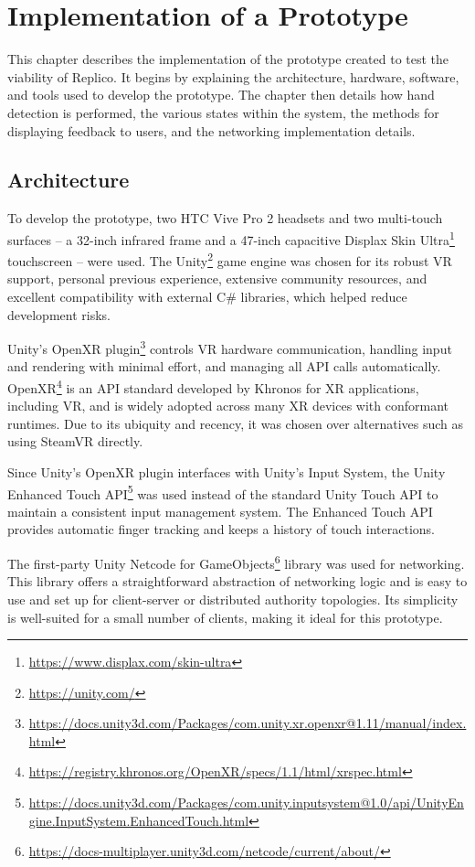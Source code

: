 \chapter{Implementation of a Prototype}\label{chap:prototype}

This chapter describes the implementation of the prototype created to test the viability of Replico. It begins by explaining the architecture, hardware, software, and tools used to develop the prototype. The chapter then details how hand detection is performed, the various states within the system, the methods for displaying feedback to users, and the networking implementation details.

\section{Architecture}
    
    To develop the prototype, two HTC Vive Pro 2 headsets and two multi-touch surfaces -- a 32-inch infrared frame and a 47-inch capacitive Displax Skin Ultra\footnote{\url{https://www.displax.com/skin-ultra} } touchscreen -- were used. The Unity\footnote{\url{https://unity.com/}} game engine was chosen for its robust VR support, personal previous experience, extensive community resources, and excellent compatibility with external C\# libraries, which helped reduce development risks.
    
    Unity's OpenXR plugin\footnote{\url{https://docs.unity3d.com/Packages/com.unity.xr.openxr@1.11/manual/index.html}} controls VR hardware communication, handling input and rendering with minimal effort, and managing all API calls automatically. OpenXR\footnote{\url{https://registry.khronos.org/OpenXR/specs/1.1/html/xrspec.html}} is an API standard developed by Khronos for XR applications, including VR, and is widely adopted across many XR devices with conformant runtimes. Due to its ubiquity and recency, it was chosen over alternatives such as using SteamVR directly.

    Since Unity's OpenXR plugin interfaces with Unity's Input System, the Unity Enhanced Touch API\footnote{\url{https://docs.unity3d.com/Packages/com.unity.inputsystem@1.0/api/UnityEngine.InputSystem.EnhancedTouch.html}} was used instead of the standard Unity Touch API to maintain a consistent input management system. The Enhanced Touch API provides automatic finger tracking and keeps a history of touch interactions.

    The first-party Unity Netcode for GameObjects\footnote{\url{https://docs-multiplayer.unity3d.com/netcode/current/about/}} library was used for networking. This library offers a straightforward abstraction of networking logic and is easy to use and set up for client-server or distributed authority topologies. Its simplicity is well-suited for a small number of clients, making it ideal for this prototype.


